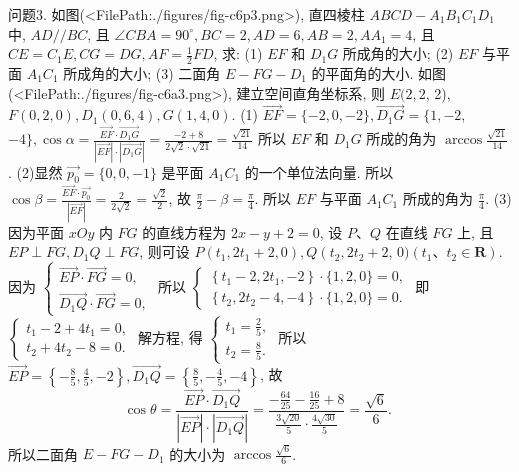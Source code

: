 问题3. 如图(<FilePath:./figures/fig-c6p3.png>), 直四棱柱 $A B C D-A_1 B_1 C_1 D_1$ 中, $A D / / B C$, 且 $\angle C B A=90^{\circ}, B C=2, A D=6, A B= 2, A A_1=4$, 且 $C E=C_1 E, C G=D G, A F= \frac{1}{2} F D$, 求:
(1) $E F$ 和 $D_1 G$ 所成角的大小;
(2) $E F$ 与平面 $A_1 C_1$ 所成角的大小;
(3) 二面角 $E-F G-D_1$ 的平面角的大小.
如图(<FilePath:./figures/fig-c6a3.png>), 建立空间直角坐标系, 则 $E(2,2$, 2), $F(0,2,0), D_1(0,6,4), G(1,4,0)$.
(1) $\overrightarrow{E F}=\{-2,0,-2\}, \overrightarrow{D_1 G}=\{1,-2$, $-4\}, \cos \alpha=\frac{\overrightarrow{E F} \cdot \overrightarrow{D_1 G}}{|\overrightarrow{E F}| \cdot\left|\overrightarrow{D_1 G}\right|}=\frac{-2+8}{2 \sqrt{2} \cdot \sqrt{21}}= \frac{\sqrt{21}}{14}$
所以 $E F$ 和 $D_1 G$ 所成的角为 $\arccos \frac{\sqrt{21}}{14}$.
(2)显然 $\overrightarrow{p_0}=\{0,0,-1\}$ 是平面 $A_1 C_1$ 的一个单位法向量.
所以 $\cos \beta=\frac{\overrightarrow{E F} \cdot \overrightarrow{p_0}}{|\overrightarrow{E F}|}=\frac{2}{2 \sqrt{2}}=\frac{\sqrt{2}}{2}$, 故 $\frac{\pi}{2}-\beta=\frac{\pi}{4}$.
所以 $E F$ 与平面 $A_1 C_1$ 所成的角为 $\frac{\pi}{4}$.
(3) 因为平面 $x O y$ 内 $F G$ 的直线方程为 $2 x-y+2=0$, 设 $P 、 Q$ 在直线 $F G$ 上, 且 $E P \perp F G, D_1 Q \perp F G$, 则可设 $P\left(t_1, 2 t_1+2,0\right), Q\left(t_2, 2 t_2+2\right.$, $0)\left(t_1 、 t_2 \in \mathbf{R}\right)$.
因为 $\left\{\begin{array}{l}\overrightarrow{E P} \cdot \overrightarrow{F G}=0, \\ \overrightarrow{D_1 Q} \cdot \overrightarrow{F G}=0,\end{array}\right.$ 所以 $\left\{\begin{array}{l}\left\{t_1-2,2 t_1,-2\right\} \cdot\{1,2,0\}=0, \\ \left\{t_2, 2 t_2-4,-4\right\} \cdot\{1,2,0\}=0 .\end{array}\right.$
即 $\left\{\begin{array}{l}t_1-2+4 t_1=0, \\ t_2+4 t_2-8=0 .\end{array}\right.$ 解方程, 得 $\left\{\begin{array}{l}t_1=\frac{2}{5}, \\ t_2=\frac{8}{5} .\end{array}\right.$
所以 $\overrightarrow{E P}=\left\{-\frac{8}{5}, \frac{4}{5},-2\right\}, \overrightarrow{D_1 Q}=\left\{\frac{8}{5},-\frac{4}{5},-4\right\}$, 故
$$
\cos \theta=\frac{\overrightarrow{E P} \cdot \overrightarrow{D_1 Q}}{|\overrightarrow{E P}| \cdot\left|\overrightarrow{D_1 Q}\right|}=\frac{-\frac{64}{25}-\frac{16}{25}+8}{\frac{3 \sqrt{20}}{5} \cdot \frac{4 \sqrt{30}}{5}}=\frac{\sqrt{6}}{6} \text {. }
$$
所以二面角 $E-F G-D_1$ 的大小为 $\arccos \frac{\sqrt{6}}{6}$.



